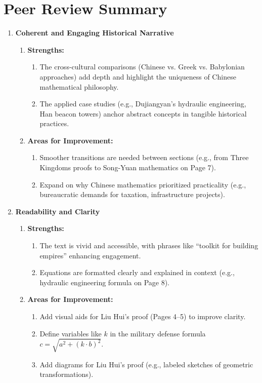\documentclass{article}
\begin{document}
\section*{Peer Review Summary}
\begin{enumerate}
    \item \textbf{Coherent and Engaging Historical Narrative}
    \begin{enumerate}
        \item \textbf{Strengths:}
        \begin{enumerate}
            \item The cross-cultural comparisons (Chinese vs. Greek vs. Babylonian approaches) add depth and highlight the uniqueness of Chinese mathematical philosophy.
            \item The applied case studies (e.g., Dujiangyan’s hydraulic engineering, Han beacon towers) anchor abstract concepts in tangible historical practices.
        \end{enumerate}
        
        \item \textbf{Areas for Improvement:}
        \begin{enumerate}
            \item Smoother transitions are needed between sections (e.g., from Three Kingdoms proofs to Song-Yuan mathematics on Page 7).
            \item Expand on why Chinese mathematics prioritized practicality (e.g., bureaucratic demands for taxation, infrastructure projects).
        \end{enumerate}
    \end{enumerate}
    
    \item \textbf{Readability and Clarity}
    \begin{enumerate}
        \item \textbf{Strengths:}
        \begin{enumerate}
            \item The text is vivid and accessible, with phrases like “toolkit for building empires” enhancing engagement.
            \item Equations are formatted clearly and explained in context (e.g., hydraulic engineering formula on Page 8).
        \end{enumerate}
        
        \item \textbf{Areas for Improvement:}
        \begin{enumerate}
            \item Add visual aids for Liu Hui’s proof (Pages 4–5) to improve clarity.
            \item Define variables like \(k\) in the military defense formula \(c = \sqrt{a^2 + (k \cdot b)^2}\).
            \item Add diagrams for Liu Hui’s proof (e.g., labeled sketches of geometric transformations).
        \end{enumerate}
    \end{enumerate}
    

\end{enumerate}
\end{document}
